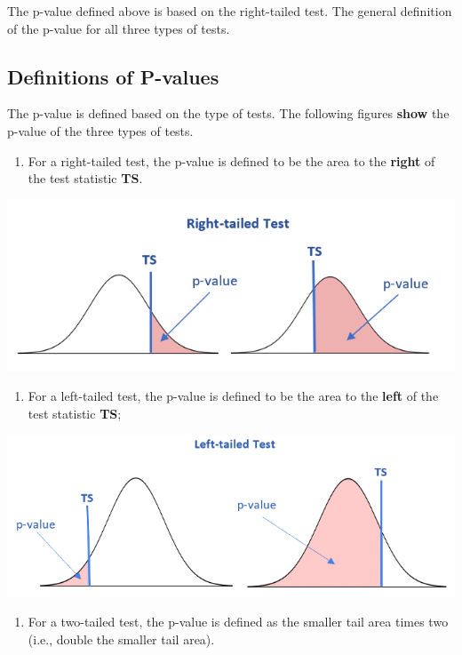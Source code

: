 \documentclass[
]{book}
\providecommand{\tightlist}{%
  \setlength{\itemsep}{0pt}\setlength{\parskip}{0pt}}
\begin{document}
The p-value defined above is based on the right-tailed test. The general definition of the p-value for all three types of tests.

\hfill\break

\hypertarget{definitions-of-p-values}{%
\subsection{Definitions of P-values}\label{definitions-of-p-values}}

The p-value is defined based on the type of tests. The following figures \textbf{show} the p-value of the three types of tests.

\begin{enumerate}
\def\labelenumi{\arabic{enumi}.}
\tightlist
\item
  For a right-tailed test, the p-value is defined to be the area to the \textbf{right} of the test statistic \textbf{TS}.
\end{enumerate}

\begin{center}\includegraphics[width=0.6\linewidth]{week09/rightTailedPVal} \end{center}

\begin{enumerate}
\def\labelenumi{\arabic{enumi}.}
\setcounter{enumi}{1}
\tightlist
\item
  For a left-tailed test, the p-value is defined to be the area to the \textbf{left} of the test statistic \textbf{TS};
\end{enumerate}

\begin{center}\includegraphics[width=0.6\linewidth]{week09/leftTailedPVal} \end{center}

\begin{enumerate}
\def\labelenumi{\arabic{enumi}.}
\setcounter{enumi}{2}
\tightlist
\item
  For a two-tailed test, the p-value is defined as the smaller tail area times two (i.e., double the smaller tail area).
\end{enumerate}
\end{document}
